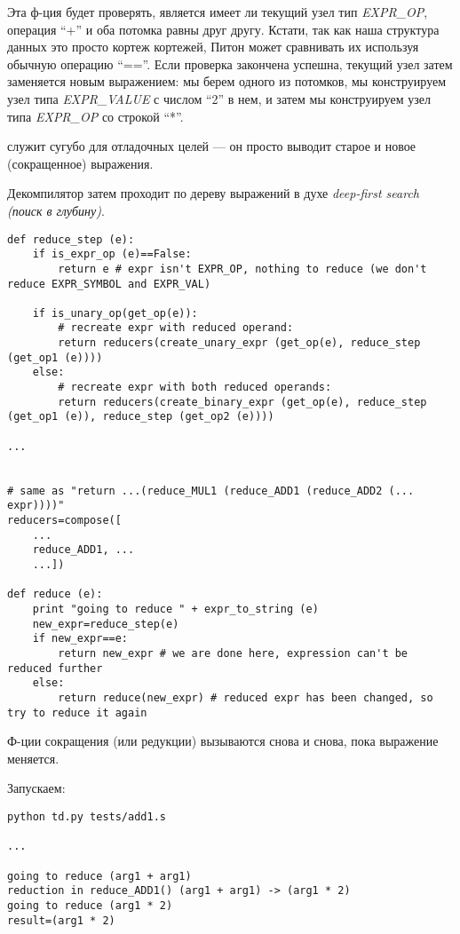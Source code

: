 Эта ф-ция будет проверять, является имеет ли текущий узел тип \textit{EXPR\_OP},
операция ``+'' и оба потомка равны друг другу.
Кстати, так как наша структура данных это просто кортеж кортежей, Питон может сравнивать их используя обычную
операцию ``==''.
Если проверка закончена успешна, текущий узел затем заменяется новым выражением:
мы берем одного из потомков, мы конструируем узел типа \textit{EXPR\_VALUE} с числом ``2'' в нем,
и затем мы конструируем узел типа \textit{EXPR\_OP} со строкой ``*''.

 служит сугубо для отладочных целей --- он просто выводит старое и новое (сокращенное) выражения.

Декомпилятор затем проходит по дереву выражений в духе 
\textit{deep-first search (поиск в глубину)}.

\begin{lstlisting}
def reduce_step (e):
    if is_expr_op (e)==False:
        return e # expr isn't EXPR_OP, nothing to reduce (we don't reduce EXPR_SYMBOL and EXPR_VAL)

    if is_unary_op(get_op(e)):
        # recreate expr with reduced operand:
        return reducers(create_unary_expr (get_op(e), reduce_step (get_op1 (e))))
    else:
        # recreate expr with both reduced operands:
        return reducers(create_binary_expr (get_op(e), reduce_step (get_op1 (e)), reduce_step (get_op2 (e))))

...


# same as "return ...(reduce_MUL1 (reduce_ADD1 (reduce_ADD2 (... expr))))"
reducers=compose([
	...
    reduce_ADD1, ...
    ...])

def reduce (e):
    print "going to reduce " + expr_to_string (e)
    new_expr=reduce_step(e)
    if new_expr==e:
        return new_expr # we are done here, expression can't be reduced further
    else:
        return reduce(new_expr) # reduced expr has been changed, so try to reduce it again
\end{lstlisting}

Ф-ции сокращения (или редукции) вызываются снова и снова, пока выражение меняется.

Запускаем:

\begin{lstlisting}
python td.py tests/add1.s

...

going to reduce (arg1 + arg1)
reduction in reduce_ADD1() (arg1 + arg1) -> (arg1 * 2)
going to reduce (arg1 * 2)
result=(arg1 * 2)
\end{lstlisting}

